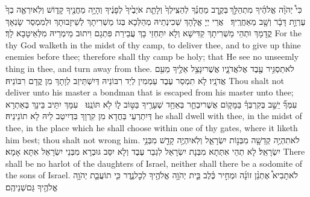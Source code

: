 {כִּי֩ יְהֹוָ֨ה אֱלֹהֶ֜יךָ מִתְהַלֵּ֣ךְ \legarmeh  בְּקֶ֣רֶב מַחֲנֶ֗ךָ לְהַצִּֽילְךָ֙ וְלָתֵ֤ת אֹיְבֶ֙יךָ֙ לְפָנֶ֔יךָ וְהָיָ֥ה מַחֲנֶ֖יךָ קָד֑וֹשׁ וְלֹֽא\maqqaf יִרְאֶ֤ה בְךָ֙ עֶרְוַ֣ת דָּבָ֔ר וְשָׁ֖ב מֵאַחֲרֶֽיךָ׃ \setuma }
{אֲרֵי יְיָ אֱלָהָךְ שְׁכִינְתֵיהּ מְהַלְּכָא בְּגוֹ מַשְׁרִיתָךְ לְשֵׁיזָבוּתָךְ וּלְמִמְסַר שָׂנְאָךְ קֳדָמָךְ וּתְהֵי מַשְׁרִיתָךְ קַדִּישָׁא וְלָא יִתַּחְזֵי בָךְ עֲבֵירַת פִּתְגָם וִיתוּב מֵימְרֵיהּ מִלְּאֵיטָבָא לָךְ׃}
{For the \lord\space thy God walketh in the midst of thy camp, to deliver thee, and to give up thine enemies before thee; therefore shall thy camp be holy; that He see no unseemly thing in thee, and turn away from thee.}{}
{לֹא\maqqaf תַסְגִּ֥יר עֶ֖בֶד אֶל\maqqaf אֲדֹנָ֑יו אֲשֶׁר\maqqaf יִנָּצֵ֥ל אֵלֶ֖יךָ מֵעִ֥ם אֲדֹנָֽיו׃}
{לָא תִמְסַר עֶבֶד עַמְמִין לְיַד רִבּוֹנֵיהּ דְּיִשְׁתֵּיזַב לְוָתָךְ מִן קֳדָם רִבּוֹנֵיהּ׃}
{Thou shalt not deliver unto his master a bondman that is escaped from his master unto thee;}{}
{עִמְּךָ֞ יֵשֵׁ֣ב בְּקִרְבְּךָ֗ בַּמָּק֧וֹם אֲשֶׁר\maqqaf יִבְחַ֛ר בְּאַחַ֥ד שְׁעָרֶ֖יךָ בַּטּ֣וֹב ל֑וֹ לֹ֖א תּוֹנֶֽנּוּ׃ \setuma }
{עִמָּךְ יִתֵּיב בֵּינָךְ בְּאַתְרָא דְּיִתְרְעֵי בַּחֲדָא מִן קִרְוָךְ בִּדְיִיטַב לֵיהּ לָא תוֹנֵינֵיהּ׃}
{he shall dwell with thee, in the midst of thee, in the place which he shall choose within one of thy gates, where it liketh him best; thou shalt not wrong him.}{}
{לֹא\maqqaf תִהְיֶ֥ה קְדֵשָׁ֖ה מִבְּנ֣וֹת יִשְׂרָאֵ֑ל וְלֹֽא\maqqaf יִהְיֶ֥ה קָדֵ֖שׁ מִבְּנֵ֥י יִשְׂרָאֵֽל׃}
{לָא תְהֵי אִתְּתָא מִבְּנָת יִשְׂרָאֵל לִגְבַר עֶבֶד וְלָא יִסַּב גּוּבְרָא מִבְּנֵי יִשְׂרָאֵל אִתָּא אָמָא׃}
{There shall be no harlot of the daughters of Israel, neither shall there be a sodomite of the sons of Israel.}{}
{לֹא\maqqaf תָבִיא֩ אֶתְנַ֨ן זוֹנָ֜ה וּמְחִ֣יר כֶּ֗לֶב בֵּ֛ית יְהֹוָ֥ה אֱלֹהֶ֖יךָ לְכׇל\maqqaf נֶ֑דֶר כִּ֧י תוֹעֲבַ֛ת יְהֹוָ֥ה אֱלֹהֶ֖יךָ גַּם\maqqaf שְׁנֵיהֶֽם׃ \setuma }
